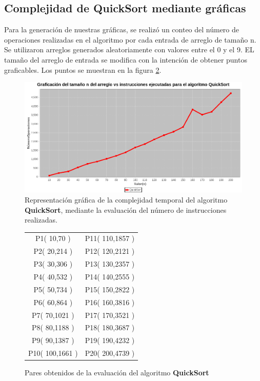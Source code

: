     \subsection*{Complejidad de \textbf{QuickSort} mediante gráficas}
        Para la generación de nuestras gráficas, se realizó un conteo del número de operaciones realizadas en el algoritmo por cada entrada de arreglo de tamaño n. Se utilizaron arreglos generados aleatoriamente con valores entre el 0 y el 9. EL tamaño del arreglo de entrada se modifica con la intención de obtener puntos graficables. Los puntos se muestran en la figura \ref{PuntosQSort}.\\
        
        \begin{figure}[h!]
            \centering
            \includegraphics[width=13cm]{QuickSort/graf-qsort.png}
            \caption{Representación gráfica de la complejidad temporal del algoritmo \textbf{QuickSort}, mediante la evaluación del número de instrucciones realizadas.}
            \label{GraficaQSort}
        \end{figure}
        
        \begin{figure}[h!]
            \centering
            \begin{tabular}{c|c}
                    P1( 10,70 ) & P11( 110,1857 )\\
                    P2( 20,214 ) & P12( 120,2121 )\\
                    P3( 30,306 ) & P13( 130,2357 )\\
                    P4( 40,532 ) & P14( 140,2555 )\\
                    P5( 50,734 ) & P15( 150,2822 )\\
                    P6( 60,864 ) & P16( 160,3816 )\\
                    P7( 70,1021 ) & P17( 170,3521 )\\
                    P8( 80,1188 ) & P18( 180,3687 )\\
                    P9( 90,1387 ) & P19( 190,4232 )\\
                    P10( 100,1661 ) & P20( 200,4739 )\\
            \end{tabular}
            \caption{Pares obtenidos de la evaluación del algoritmo \textbf{QuickSort}}
            \label{PuntosQSort}
        \end{figure}
        
